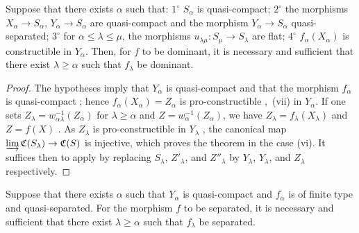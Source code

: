 \begin{proposition}[8.10.3]
\label{IV.8.10.3}
Suppose that there exists $\alpha$ such that: $1^\circ$ $S_\alpha$ is quasi-compact; $2^\circ$ the morphisms $X_\alpha\to S_\alpha$, $Y_\alpha\to S_\alpha$ are quasi-compact and the morphism $Y_\alpha\to S_\alpha$ quasi-separated; $3^\circ$ for $\alpha\leqslant\lambda\leqslant\mu$, the morphisms $u_{\lambda\mu}:S_\mu\to S_\lambda$ are flat; $4^\circ$ $f_\alpha(X_\alpha)$ is constructible in $Y_\alpha$.
Then, for $f$ to be dominant, it is necessary and sufficient that there exist $\lambda\geqslant\alpha$ such that $f_\lambda$ be dominant.
\end{proposition}

\begin{proof}
The hypotheses imply that $Y_\alpha$ is quasi-compact and that the morphism $f_\alpha$ is quasi-compact ; hence $f_\alpha(X_\alpha)=Z_\alpha$ is pro-constructible ,~(vii) in $Y_\alpha$.
If one sets $Z_\lambda=w_{\alpha\lambda}^{-1}(Z_\alpha)$ for $\lambda\geqslant\alpha$ and $Z=w_\alpha^{-1}(Z_\alpha)$, we have $Z_\lambda=f_\lambda(X_\lambda)$ and $Z=f(X)$ .
As $Z_\lambda$ is pro-constructible in $Y_\lambda$ , the canonical map $\varinjlim\mathfrak{C}(S_\lambda)\to\mathfrak{C}(S)$ is injective, which proves the theorem in the case (vi).
It suffices then to apply  by replacing $S_\lambda$, $Z'_\lambda$, and $Z''_\lambda$ by $Y_\lambda$, $Y_\lambda$, and $Z_\lambda$ respectively.
\end{proof}

\begin{proposition}[8.10.4]
\label{IV.8.10.4}
Suppose that there exists $\alpha$ such that $Y_\alpha$ is quasi-compact and $f_\alpha$ is of finite type and quasi-separated.
For the morphism $f$ to be separated, it is necessary and sufficient that there exist $\lambda\geqslant\alpha$ such that $f_\lambda$ be separated.
\end{proposition}

